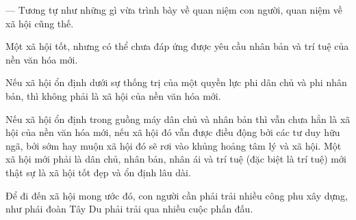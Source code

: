 — Tương tự như những gì vừa trình bày về quan niệm con người, quan niệm về xã hội cũng thế.

Một xã hội tốt, nhưng có thể chưa đáp ứng được yêu cầu nhân bản và trí tuệ của nền văn hóa mới.

Nếu xã hội ổn định dưới sự thống trị của một quyền lực phi dân chủ và phi nhân bản, thì không phải là xã hội của nền văn hóa mới.

Nếu xã hội ổn định trong guồng máy dân chủ và nhân bản thì vẫn chưa hẳn là xã hội của nền văn hóa mới, nếu xã hội đó vẫn được điều động bởi các tư duy hữu ngã, bởi sớm hay muộn xã hội đó sẽ rơi vào khủng hoảng tâm lý và xã hội. Một xã hội mới phải là dân chủ, nhân bản, nhân ái và trí tuệ (đặc biệt là trí tuệ) mới thật sự là xã hội tốt đẹp và ổn định lâu dài.

Để đi đến xã hội mong ước đó, con người cần phải trải nhiều công phu xây dựng, như phái đoàn Tây Du phải trải qua nhiều cuộc phấn đấu.
